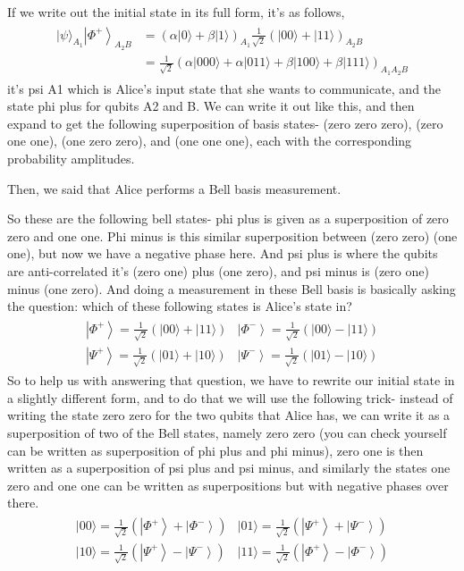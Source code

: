 If we write out the initial state in its full form, it's as follows,
\begin{align}
    \begin{aligned}
|\psi\rangle_{A_{1}}\left|\Phi^{+}\right\rangle_{A_{2} B} &=(\alpha|0\rangle+\beta|1\rangle)_{A_{1}} \frac{1}{\sqrt{2}}(|00\rangle+|11\rangle)_{A_{2} B} \\
&=\frac{1}{\sqrt{2}}(\alpha|000\rangle+\alpha|011\rangle+\beta|100\rangle+\beta|111\rangle)_{A_{1} A_{2} B}
\end{aligned}
\end{align}
it's psi A1 which is Alice's input state that she wants to communicate, and the state phi plus for qubits A2 and B. We can write it out like this, and then expand to get the following superposition of basis states- (zero zero zero), (zero one one), (one zero zero), and (one one one), each with the corresponding probability amplitudes.

Then, we said that Alice performs a Bell basis measurement.

So these are the following bell states- phi plus is given as a superposition of zero zero and one one. Phi minus is this similar superposition between (zero zero) (one one), but now we have a negative phase here. And psi plus is where the qubits are anti-correlated it's (zero one) plus (one zero), and psi minus is (zero one) minus (one zero). And doing a measurement in these Bell basis is basically asking the question: which of these following states is Alice's state in? 
\begin{align}
    \begin{array}{ll}
\left|\Phi^{+}\right\rangle=\frac{1}{\sqrt{2}}(|00\rangle+|11\rangle) & \left|\Phi^{-}\right\rangle=\frac{1}{\sqrt{2}}(|00\rangle-|11\rangle) \\
\left|\Psi^{+}\right\rangle=\frac{1}{\sqrt{2}}(|01\rangle+|10\rangle) & \left|\Psi^{-}\right\rangle=\frac{1}{\sqrt{2}}(|01\rangle-|10\rangle)
\end{array}
\end{align}
So to help us with answering that question, we have to rewrite our initial state in a slightly different form, and to do that we will use the following trick- instead of writing the state zero zero for the two qubits that Alice has, we can write it as a superposition of two of the Bell states, namely zero zero (you can check yourself can be written as superposition of phi plus and phi minus), zero one is then written as a superposition of psi plus and psi minus, and similarly the states one zero and one one can be written as superpositions but with negative phases over there.
\begin{align}
    \begin{array}{ll}
|00\rangle=\frac{1}{\sqrt{2}}\left(\left|\Phi^{+}\right\rangle+\left|\Phi^{-}\right\rangle\right) & |01\rangle=\frac{1}{\sqrt{2}}\left(\left|\Psi^{+}\right\rangle+\left|\Psi^{-}\right\rangle\right) \\
|10\rangle=\frac{1}{\sqrt{2}}\left(\left|\Psi^{+}\right\rangle-\left|\Psi^{-}\right\rangle\right) & |11\rangle=\frac{1}{\sqrt{2}}\left(\left|\Phi^{+}\right\rangle-\left|\Phi^{-}\right\rangle\right)
\end{array}
\end{align}

